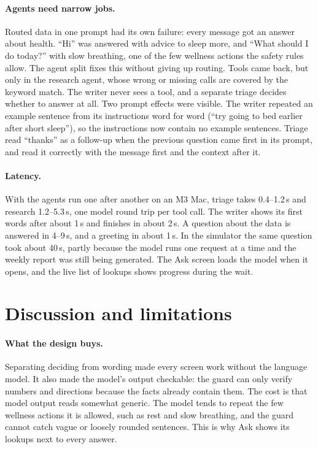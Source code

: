 \documentclass[11pt,a4paper]{article}
\begin{document}
\paragraph{Agents need narrow jobs.} Routed data in one prompt had its own failure: every message got an answer about health. ``Hi'' was answered with advice to sleep more, and ``What should I do today?'' with slow breathing, one of the few wellness actions the safety rules allow. The agent split fixes this without giving up routing. Tools came back, but only in the research agent, whose wrong or missing calls are covered by the keyword match. The writer never sees a tool, and a separate triage decides whether to answer at all. Two prompt effects were visible. The writer repeated an example sentence from its instructions word for word (``try going to bed earlier after short sleep''), so the instructions now contain no example sentences. Triage read ``thanks'' as a follow-up when the previous question came first in its prompt, and read it correctly with the message first and the context after it.

\paragraph{Latency.} With the agents run one after another on an M3 Mac, triage takes 0.4--1.2\,s and research 1.2--5.3\,s, one model round trip per tool call. The writer shows its first words after about 1\,s and finishes in about 2\,s. A question about the data is answered in 4--9\,s, and a greeting in about 1\,s. In the simulator the same question took about 40\,s, partly because the model runs one request at a time and the weekly report was still being generated. The Ask screen loads the model when it opens, and the live list of lookups shows progress during the wait.

\section{Discussion and limitations}

\paragraph{What the design buys.} Separating deciding from wording made every screen work without the language model. It also made the model's output checkable: the guard can only verify numbers and directions because the facts already contain them. The cost is that model output reads somewhat generic. The model tends to repeat the few wellness actions it is allowed, such as rest and slow breathing, and the guard cannot catch vague or loosely rounded sentences. This is why Ask shows its lookups next to every answer.
\end{document}
